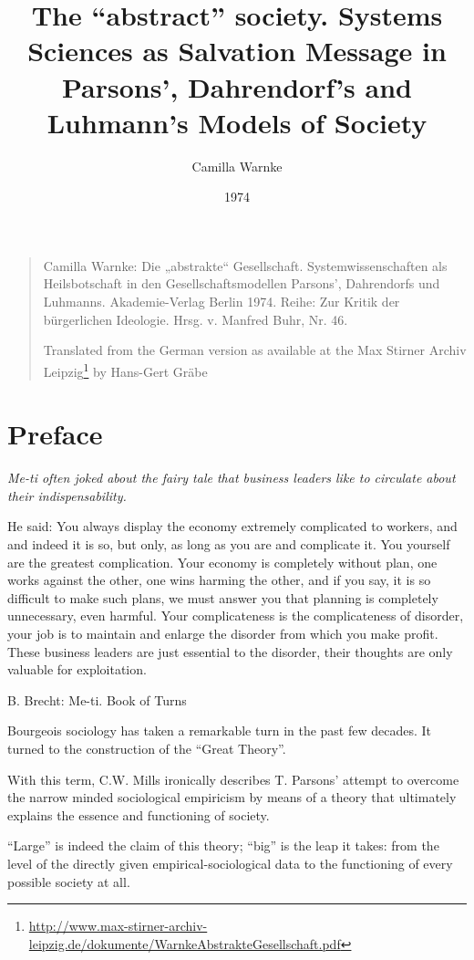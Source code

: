 \documentclass[11pt,a4paper]{article}
\title{The \enquote{abstract} society. Systems Sciences as Salvation Message
  in Parsons', Dahrendorf's and Luhmann's Models of Society}
\author{Camilla Warnke}
\date{1974}
\begin{document}
\maketitle

\begin{quote}
  Camilla Warnke: Die „abstrakte“ Gesellschaft. Systemwissenschaften als
  Heilsbotschaft in den Gesellschaftsmodellen Parsons’, Dahrendorfs und
  Luhmanns. Akademie-Verlag Berlin 1974. Reihe: Zur Kritik der bürgerlichen
  Ideologie. Hrsg. v. Manfred Buhr, Nr. 46.
  
  Translated from the German version as available at the Max Stirner Archiv
  Leipzig\footnote{\url{http://www.max-stirner-archiv-leipzig.de/dokumente/WarnkeAbstrakteGesellschaft.pdf}}
  by Hans-Gert Gräbe
\end{quote}

\section*{Preface}

{\it 
  Me-ti often joked about the fairy tale that business leaders like to circulate
  about their indispensability.

  He said: You always display the economy extremely complicated to workers, and
  and indeed it is so, but only, as long as you are and complicate it. You
  yourself are the greatest complication. Your economy is completely without
  plan, one works against the other, one wins harming the other, and if you say,
  it is so difficult to make such plans, we must answer you that planning is
  completely unnecessary, even harmful.  Your complicateness is the
  complicateness of disorder, your job is to maintain and enlarge the disorder
  from which you make profit. These business leaders are just essential to the
  disorder, their thoughts are only valuable for exploitation.

  B. Brecht: Me-ti. Book of Turns}

Bourgeois sociology has taken a remarkable turn in the past few decades. It
turned to the construction of the \enquote{Great Theory}.

With this term, C.W. Mills \cite[64-92]{Mills1963} ironically describes
T. Parsons' attempt to overcome the narrow minded sociological empiricism by
means of a theory that ultimately explains the essence and functioning of
society.

“Large” is indeed the claim of this theory; “big” is the leap it takes: from
the level of the directly given empirical-sociological data to the functioning
of every possible society at all.
\end{document}
